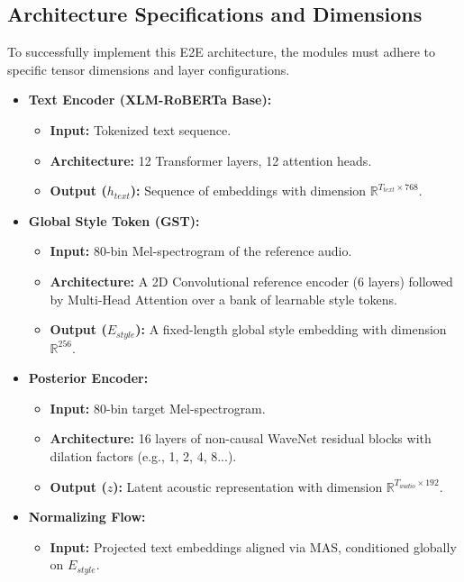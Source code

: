 \documentclass[11pt]{article}
\begin{document}
\subsection{Architecture Specifications and Dimensions}

To successfully implement this E2E architecture, the modules must adhere to specific tensor dimensions and layer configurations.

\begin{itemize}[leftmargin=1.5em]
    \item \textbf{Text Encoder (XLM-RoBERTa Base):}
    \begin{itemize}
        \item \textbf{Input:} Tokenized text sequence.
        \item \textbf{Architecture:} 12 Transformer layers, 12 attention heads.
        \item \textbf{Output ($h_{text}$):} Sequence of embeddings with dimension $\mathbb{R}^{T_{text} \times 768}$.
    \end{itemize}
    \item \textbf{Global Style Token (GST):}
    \begin{itemize}
        \item \textbf{Input:} 80-bin Mel-spectrogram of the reference audio.
        \item \textbf{Architecture:} A 2D Convolutional reference encoder (6 layers) followed by Multi-Head Attention over a bank of learnable style tokens.
        \item \textbf{Output ($E_{style}$):} A fixed-length global style embedding with dimension $\mathbb{R}^{256}$.
    \end{itemize}
    \item \textbf{Posterior Encoder:}
    \begin{itemize}
        \item \textbf{Input:} 80-bin target Mel-spectrogram.
        \item \textbf{Architecture:} 16 layers of non-causal WaveNet residual blocks with dilation factors (e.g., 1, 2, 4, 8...).
        \item \textbf{Output ($z$):} Latent acoustic representation with dimension $\mathbb{R}^{T_{audio} \times 192}$.
    \end{itemize}
    \item \textbf{Normalizing Flow:}
    \begin{itemize}
        \item \textbf{Input:} Projected text embeddings aligned via MAS, conditioned globally on $E_{style}$.

\end{itemize}
\end{itemize}
\end{document}
